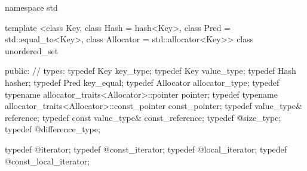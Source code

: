 %
\begin{codeblock}
namespace std {
  template <class Key,
            class Hash = hash<Key>,
            class Pred = std::equal_to<Key>,
            class Allocator = std::allocator<Key>>
  class unordered_set {
  public:
    // types:
    typedef Key                                                 key_type;
    typedef Key                                                 value_type;
    typedef Hash                                                hasher;
    typedef Pred                                                key_equal;
    typedef Allocator                                           allocator_type;
    typedef typename allocator_traits<Allocator>::pointer       pointer;
    typedef typename allocator_traits<Allocator>::const_pointer const_pointer;
    typedef value_type&                                         reference;
    typedef const value_type&                                   const_reference;
    typedef @\impdefnc@                              size_type;
    typedef @\impdefnc@                              difference_type;

    typedef @\impdefnc@                              iterator;
    typedef @\impdefnc@                              const_iterator;
    typedef @\impdefnc@                              local_iterator;
    typedef @\impdefnc@                              const_local_iterator;

}}
\end{codeblock}
